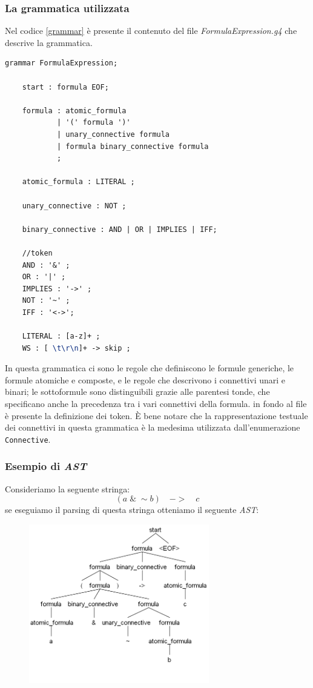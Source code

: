 \documentclass[a4paper,12pt]{report}
\begin{document}
\subsubsection{La grammatica utilizzata}

Nel codice \ref{grammar} è presente il contenuto del file \emph{FormulaExpression.g4} che descrive la grammatica.

\begin{lstlisting}[language=TeX, label=grammar, caption={file FormulaExpression.g4}]
    grammar FormulaExpression;

    start : formula EOF;

    formula : atomic_formula
            | '(' formula ')' 
            | unary_connective formula
            | formula binary_connective formula
            ;

    atomic_formula : LITERAL ;

    unary_connective : NOT ;

    binary_connective : AND | OR | IMPLIES | IFF;

    //token
    AND : '&' ;
    OR : '|' ;
    IMPLIES : '->' ;
    NOT : '~' ;
    IFF : '<->';

    LITERAL : [a-z]+ ;
    WS : [ \t\r\n]+ -> skip ;
\end{lstlisting}
In questa grammatica ci sono le regole che definiscono le formule generiche, le formule atomiche e composte, e le regole che descrivono i connettivi unari e binari; le sottoformule sono distinguibili grazie alle parentesi tonde, che specificano anche la precedenza tra i vari connettivi della formula. in fondo al file è presente la definizione dei token. È bene notare che la rappresentazione testuale dei connettivi in questa grammatica è la medesima utilizzata dall'enumerazione \texttt{Connective}.

\subsubsection{Esempio di \emph{AST}}
Consideriamo la seguente stringa:
\[ (a \; \& \; \sim b) \quad -> \quad c \]
se eseguiamo il parsing di questa stringa otteniamo il seguente \emph{AST}:
\begin{figure}[H]
    \includegraphics[width=0.7\textwidth, height=0.5\textheight]{img/antlr4_parse_tree.png}
\end{figure}
\end{document}
